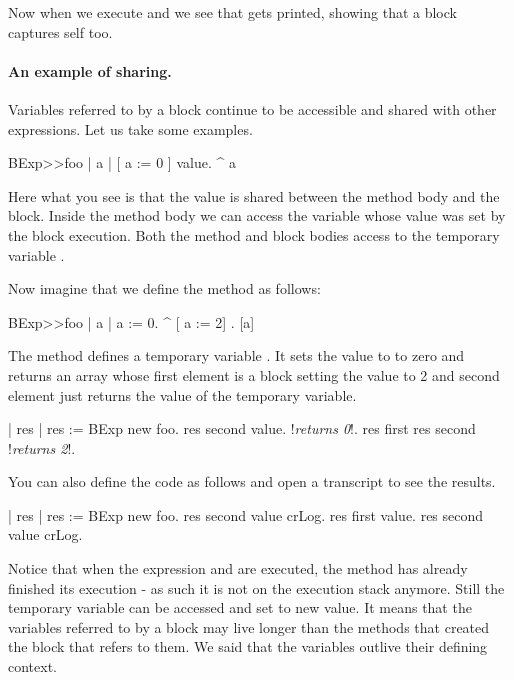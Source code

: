 \documentclass[a4paper,10pt,twoside]{book}
\begin{document}
Now when we execute  and we see that  gets printed, showing that a block captures self too. 

\paragraph{An example of sharing.}

Variables referred to by a block continue to be accessible and shared with other expressions. Let us 
take some examples. 

\begin{code}{}
BExp>>foo
	| a |
	[ a := 0 ] value.
	^ a
\end{code}

Here what you see is that the value is shared between the method body and the block. Inside the method body we can access the variable whose value was set by the block execution. 
Both the method  and block bodies access to the temporary variable .

Now imagine that we define the method  as follows:

\begin{code}{}
BExp>>foo
	| a |
	a := 0. 
	^ {[ a := 2] . [a]} 
\end{code}

The method  defines a temporary variable . It sets the value to 
to zero and returns an array whose first element is a block setting the value to 2 and second element just returns the value of the temporary variable. 

\begin{code}{}
| res | 
res := BExp new foo.
res second value.
     !\emph{returns 0}!. 
res first 
res second
     !\emph{returns 2}!. 
\end{code}

You can also define the code as follows and open a transcript to see the results.


\begin{code}
| res |
res := BExp new foo.
res second value crLog.
res first value.
res second value crLog.
\end{code}

Notice that when the expression  and  are executed, the method  has already finished its execution - as such it is not on the execution stack anymore.  Still the temporary variable  can be accessed and set to new value. It means that the variables referred to by a block may live longer than the methods that created the block that refers to them. We said that the variables outlive their defining context. 
\end{document}
